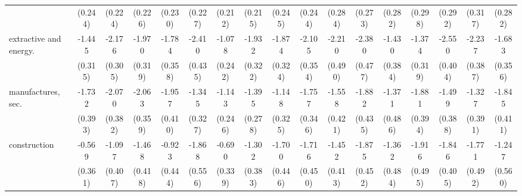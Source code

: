 {\begin{tabular}{l*{16}{c}}
                    &     (0.244)         &     (0.224)         &     (0.226)         &     (0.230)         &     (0.227)         &     (0.212)         &     (0.215)         &     (0.245)         &     (0.244)         &     (0.284)         &     (0.273)         &     (0.282)         &     (0.298)         &     (0.292)         &     (0.317)         &     (0.282)         \\
[1em]
extractive and energy.&      -1.445\sym{***}&      -2.176\sym{***}&      -1.970\sym{***}&      -1.784\sym{***}&      -2.410\sym{***}&      -1.078\sym{***}&      -1.932\sym{***}&      -1.874\sym{***}&      -2.105\sym{***}&      -2.210\sym{***}&      -2.380\sym{***}&      -1.430\sym{***}&      -1.374\sym{***}&      -2.550\sym{***}&      -2.237\sym{***}&      -1.683\sym{***}\\
                    &     (0.315)         &     (0.305)         &     (0.319)         &     (0.358)         &     (0.435)         &     (0.242)         &     (0.322)         &     (0.324)         &     (0.354)         &     (0.490)         &     (0.477)         &     (0.384)         &     (0.319)         &     (0.404)         &     (0.387)         &     (0.356)         \\
[1em]
manufactures, sec.  &      -1.732\sym{***}&      -2.070\sym{***}&      -2.063\sym{***}&      -1.957\sym{***}&      -1.345\sym{***}&      -1.143\sym{***}&      -1.395\sym{***}&      -1.148\sym{***}&      -1.757\sym{***}&      -1.558\sym{***}&      -1.882\sym{***}&      -1.371\sym{**} &      -1.881\sym{***}&      -1.499\sym{***}&      -1.327\sym{***}&      -1.845\sym{***}\\
                    &     (0.393)         &     (0.382)         &     (0.359)         &     (0.410)         &     (0.327)         &     (0.246)         &     (0.278)         &     (0.325)         &     (0.346)         &     (0.421)         &     (0.435)         &     (0.486)         &     (0.394)         &     (0.388)         &     (0.391)         &     (0.411)         \\
[1em]
construction        &      -0.569         &      -1.097\sym{**} &      -1.468\sym{***}&      -0.923\sym{*}  &      -1.868\sym{***}&      -0.690\sym{*}  &      -1.302\sym{***}&      -1.700\sym{***}&      -1.716\sym{***}&      -1.452\sym{***}&      -1.875\sym{***}&      -1.362\sym{**} &      -1.916\sym{***}&      -1.846\sym{***}&      -1.771\sym{***}&      -1.247\sym{*}  \\
                    &     (0.361)         &     (0.407)         &     (0.418)         &     (0.444)         &     (0.556)         &     (0.339)         &     (0.383)         &     (0.446)         &     (0.450)         &     (0.413)         &     (0.452)         &     (0.484)         &     (0.495)         &     (0.405)         &     (0.492)         &     (0.560)         \\

\end{tabular}}
